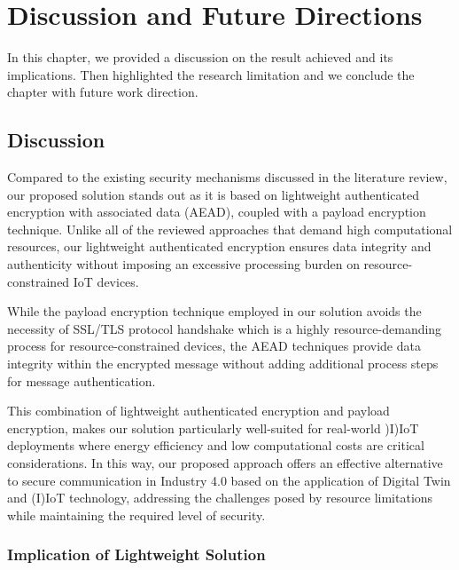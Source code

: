

\chapter{Discussion and Future Directions }
\label{Chapter5} %
In this chapter, we provided a discussion on the result achieved and its implications. Then highlighted the research limitation and we conclude the chapter with future work direction. 

\section{Discussion}
Compared to the existing security mechanisms discussed in the literature review, our proposed solution stands out as it is based on lightweight authenticated encryption with associated data (AEAD), coupled with a payload encryption technique. Unlike all of the reviewed approaches that demand high computational resources, our lightweight authenticated encryption ensures data integrity and authenticity without imposing an excessive processing burden on resource-constrained IoT devices.

While the payload encryption technique employed in our solution avoids the necessity of SSL/TLS protocol handshake which is a highly resource-demanding process for resource-constrained devices, the AEAD techniques provide data integrity within the encrypted message without adding additional process steps for message authentication.

 This combination of lightweight authenticated encryption and payload encryption, makes our solution particularly well-suited for real-world )I)IoT deployments where energy efficiency and low computational costs are critical considerations. In this way, our proposed approach offers an effective alternative to secure communication in Industry 4.0 based on the application of Digital Twin and (I)IoT technology, addressing the challenges posed by resource limitations while maintaining the required level of security. 


\subsection{Implication of Lightweight Solution}

